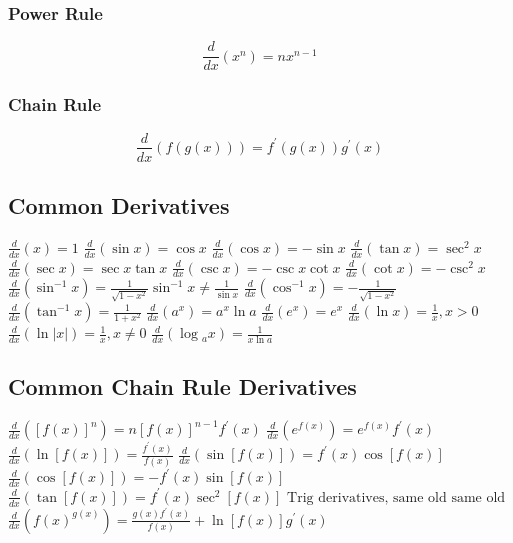 \documentclass[10pt,landscape,letterpaper]{cheatsheet}
\begin{document}
\subsubsection*{Power Rule}
$$ \frac{d}{dx}(x^n)=nx^{n-1} $$

\subsubsection*{Chain Rule}
$$ \frac{d}{dx}(f(g(x)))=f^{\prime}(g(x))g^{\prime}(x) $$

\subsection*{Common Derivatives}
$ \frac{d}{dx}(x)=1                                                                                      $
$ \frac{d}{dx}(\sin {x})=\cos {x}                                                                        $
$ \frac{d}{dx}(\cos {x})=-\sin {x}                                                                       $
$ \frac{d}{dx}(\tan {x})=\sec ^{2} {x}                                                                   $
$ \frac{d}{dx}(\sec {x})=\sec {x} \tan {x}                                                               $
$ \frac{d}{dx}(\csc {x})=-\csc {x} \cot {x}                                                              $
$ \frac{d}{dx}(\cot {x})=-\csc ^2 {x}                                                                    $
$ \frac{d}{dx}(\sin ^{-1} {x})=\frac{1}{\sqrt{1-x^2}} \sin^{-1} {x} \neq \frac{1}{\sin {x}} $
$ \frac{d}{dx}(\cos ^{-1} {x})=-\frac{1}{\sqrt{1-x^2}}                                                   $
$ \frac{d}{dx}(\tan ^{-1} {x})=\frac{1}{1+x^2}                                                           $
$ \frac{d}{dx}(a ^ {x})=a^{x} \ln {a}                                                                    $
$ \frac{d}{dx}(e ^ {x})=e^{x}                                                                            $
$ \frac{d}{dx}(\ln {x})=\frac{1}{x}, x > 0                                                               $
$ \frac{d}{dx}(\ln {|x|})=\frac{1}{x}, x \neq 0                                                          $
$ \frac{d}{dx}(\log {_a}{x})=\frac{1}{x \ln {a}}                                                         $

\subsection*{Common Chain Rule Derivatives}
$ \frac{d}{dx}([f(x)]^n)=n[f(x)]^{n-1}f^{\prime}(x) $
$ \frac{d}{dx}(e^{f(x)})=e^{f(x)}f^{\prime}(x)      $
$ \frac{d}{dx}(\ln [{f(x)}])=\frac{f^{\prime}(x)}{f(x)}      $
$ \frac{d}{dx}(\sin [{f(x)}])=f^{\prime}(x)\cos[{f(x)}]    $
$ \frac{d}{dx}(\cos [{f(x)}])=-f^{\prime}(x)\sin[{f(x)}]    $
$ \frac{d}{dx}(\tan [{f(x)}])=f^{\prime}(x)\sec ^{2}[{f(x)}]    $
$ \text{Trig derivatives, same old same old}$
$ \frac{d}{dx}(f(x)^{g(x)})=\frac{g(x)f^{\prime}(x)}{f(x)}+\ln{[f(x)]}g^{\prime}(x)   $
\end{document}
